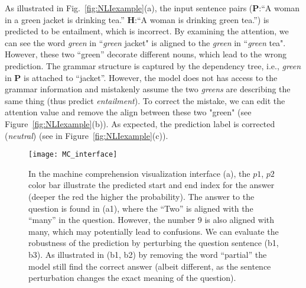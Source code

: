 As illustrated in Fig.~\ref{fig:NLIexample}(a), the input sentence pairs (\textbf{P}:``A woman in a green jacket is drinking tea.'' \textbf{H}:``A woman is drinking green tea.'') is predicted to be entailment, which is incorrect.
By examining the attention, we can see the word \emph{green} in ``\emph{green} jacket" is aligned to the \emph{green} in ``\emph{green} tea". However, these two ``green'' decorate different nouns, which lead to the wrong prediction. The grammar structure is captured by the dependency tree, i.e., \emph{green} in \textbf{P} is attached to ``jacket''. However, the model does not has access to the grammar information and mistakenly assume the two \emph{greens} are describing the same thing (thus predict \emph{entailment}). 
%
To correct the mistake, we can edit the attention value and remove the align between these two "green" (see Figure~\ref{fig:NLIexample}(b)).
As expected, the prediction label is corrected (\emph{neutral}) (see in Figure~\ref{fig:NLIexample}(c)).

\begin{figure*}[t]
\centering
\vspace{-2mm}
 \texttt{[image: MC\_interface]}
  \vspace{-6mm}
 \caption{
In the machine comprehension visualization interface (a), the $p1$, $p2$ color bar illustrate the predicted start and end index for the answer (deeper the red the higher the probability).
The answer to the question is found in (a1), where the ``Two'' is aligned with the ``many'' in the question. However, the number 9 is also aligned with many, which may potentially lead to confusions.
%
We can evaluate the robustness of the prediction by perturbing the question sentence (b1, b3). As illustrated in (b1, b2) by removing the word ``partial'' the model still find the correct answer (albeit different, as the sentence perturbation changes the exact meaning of the question). 
}
\label{fig:MCexample}
\end{figure*}

